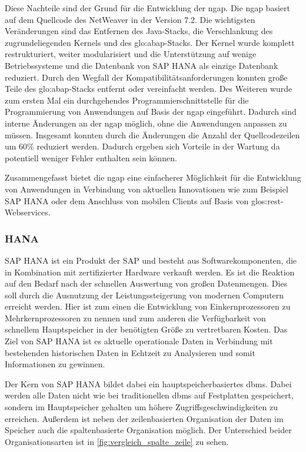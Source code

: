 \begin{onehalfspacing}
Diese Nachteile sind der Grund für die Entwicklung der \gls{ngap}. Die \gls{ngap} basiert auf dem Quellcode des \gls{NetWeaver} in der Version 7.2. Die wichtigsten Veränderungen sind das Entfernen des Java-Stacks, die Verschlankung des zugrundeliegenden Kernels und des \gls{glo:abap}-Stacks. Der Kernel wurde komplett restrukturiert, weiter modularisiert und die Unterstützung auf wenige Betriebssysteme und die Datenbank von SAP HANA als einzige Datenbank reduziert. Durch den Wegfall der Kompatibilitätsanforderungen konnten große Teile des \gls{glo:abap}-Stacks entfernt oder vereinfacht werden. Des Weiteren wurde zum ersten Mal ein durchgehendes Programmierschnittstelle für die Programmierung von Anwendungen auf Basis der \gls{ngap} eingeführt. Dadurch sind interne Änderungen an der \gls{ngap} möglich, ohne die Anwendungen anpassen zu müssen. Insgesamt konnten durch die Änderungen die Anzahl der Quellcodezeilen um 60\% reduziert werden. Dadurch ergeben sich Vorteile in der Wartung da potentiell weniger Fehler enthalten sein können.

Zusammengefasst bietet die \gls{ngap} eine einfacherer Möglichkeit für die Entwicklung von Anwendungen in Verbindung von aktuellen Innovationen wie zum Beispiel SAP HANA oder dem Anschluss von mobilen Clients auf Basis von \gls{glos:rest}-Webservices.

\subsubsection{HANA}
SAP HANA ist ein Produkt der SAP und besteht aus Softwarekomponenten, die in Kombination mit zertifizierter Hardware verkauft werden. Es ist die Reaktion auf den Bedarf nach der schnellen Auswertung von großen Datenmengen. Dies soll durch die Ausnutzung der Leistungssteigerung von modernen Computern erreicht werden. Hier ist zum einen die Entwicklung von Einkernprozessoren zu Mehrkernprozessoren zu nennen und zum anderen die Verfügbarkeit von schnellem Hauptspeicher in der benötigten Größe zu vertretbaren Kosten. Das Ziel von SAP HANA ist es aktuelle operationale Daten in Verbindung mit bestehenden historischen Daten in Echtzeit zu Analysieren und somit Informationen zu gewinnen.

Der Kern von SAP HANA bildet dabei ein hauptspeicherbasiertes \gls{dbms}. Dabei werden alle Daten nicht wie bei traditionellen \gls{dbms} auf Festplatten gespeichert, sondern im Hauptspeicher gehalten um höhere Zugriffsgeschwindigkeiten zu erreichen. Außerdem ist neben der zeilenbasierten Organisation der Daten im Speicher auch die spaltenbasierte Organisation möglich. Der Unterschied beider Organisationsarten ist in \vref{fig:vergleich_spalte_zeile} zu sehen. 


\end{onehalfspacing}
